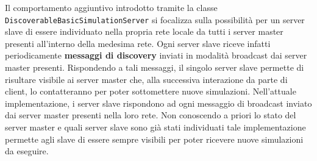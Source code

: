 Il comportamento aggiuntivo introdotto tramite la classe \texttt{DiscoverableBasicSimulationServer} si focalizza sulla possibilità per un server slave di essere individuato nella propria rete locale da tutti i server master
presenti all'interno della medesima rete. Ogni server slave riceve infatti periodicamente \textbf{messaggi di discovery} inviati in modalità broadcast dai server master presenti. Rispondendo a tali messaggi, il singolo server slave
permette di risultare visibile ai server master che, alla successiva interazione da parte di client, lo contatteranno per poter sottomettere nuove simulazioni.
Nell'attuale implementazione, i server slave rispondono ad ogni messaggio di broadcast inviato dai server master presenti nella loro rete. Non conoscendo a priori lo stato del server master e quali server slave sono già stati individuati
tale implementazione permette agli slave di essere sempre visibili per poter ricevere nuove simulazioni da eseguire.
